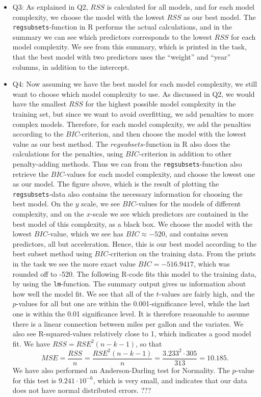 \documentclass[]{article}
\providecommand{\tightlist}{%
  \setlength{\itemsep}{0pt}\setlength{\parskip}{0pt}}
\begin{document}
\begin{itemize}
\tightlist
\item
  Q3: As explained in Q2, \(RSS\) is calculated for all models, and for
  each model complexity, we choose the model with the lowest \(RSS\) as
  our best model. The \texttt{regsubsets}-function in R performs the
  actual calculations, and in the summary we can see which predictors
  corresponds to the lowest \(RSS\) for each model complexity. We see
  from this summary, which is printed in the task, that the best model
  with two predictors uses the ``weight'' and ``year'' columns, in
  addition to the intercept.
\item
  Q4: Now assuming we have the best model for each model complexity, we
  still want to choose which model complexity to use. As discussed in
  Q2, we would have the smallest \(RSS\) for the highest possible model
  complexity in the training set, but since we want to avoid
  overfitting, we add penalties to more complex models. Therefore, for
  each model complexity, we add the penalties according to the
  \(BIC\)-criterion, and then choose the model with the lowest value as
  our best method. The \(regsubsets\)-function in R also does the
  calculations for the penalties, using \(BIC\)-criterion in addition to
  other penalty-adding methods. Thus we can from the
  \texttt{regsubsets}-function also retrieve the \(BIC\)-values for each
  model complexity, and choose the lowest one as our model. The figure
  above, which is the result of plotting the \texttt{regsubsets}-data
  also contains the necessary information for choosing the best model.
  On the \(y\) scale, we see \(BIC\)-values for the models of different
  complexity, and on the \(x\)-scale we see which predictors are
  contained in the best model of this complexity, as a black box. We
  choose the model with the lowest \(BIC\)-value, which we see has
  \(BIC\approx -520\), and contains seven predictors, all but
  acceleration. Hence, this is our best model according to the best
  subset method using \(BIC\)-criterion on the training data. From the
  prints in the task we see the more exact value \(BIC=-516.9417\),
  which was rounded off to -520. The following R-code fits this model to
  the training data, by using the \texttt{lm}-function. The summary
  output gives us information about how well the model fit. We see that
  all of the \(t\)-values are fairly high, and the \(p\)-values for all
  but one are within the 0.001-significance level, while the last one is
  within the 0.01 significance level. It is therefore reasonable to
  assume there is a linear connection between miles per gallon and the
  variates. We also see R-squared-values relatively close to 1, which
  indicates a good model fit. We have \(RSS=RSE^2(n-k-1)\), so that
  \[MSE=\frac{RSS}{n}=\frac{RSE^2(n-k-1)}{n}=\frac{3.233^2\cdot 305}{313}=10.185.\]
  We have also performed an Anderson-Darling test for Normality. The
  \(p\)-value for this test is \(9.241\cdot 10^{-6}\), which is very
  small, and indicates that our data does not have normal distributed
  errors. ???
\end{itemize}
\end{document}
